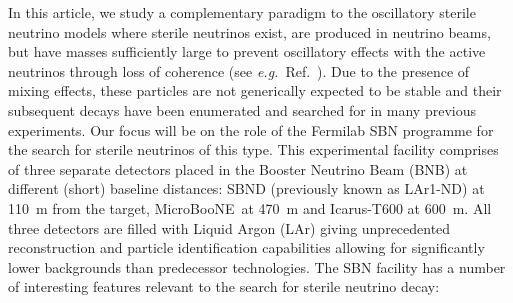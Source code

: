 \documentclass[11pt, a4paper]{article}
\newcommand{\refref}[1]{Ref.~\cite{#1}}
\def\eg{\emph{e.g.}}
\def\muboone{MicroBooNE}
\def\icarus{Icarus}
\newcommand{\newtext}[2]{\textcolor{#1}{\ul{#2}}}
\begin{document}
In this article, we study a complementary paradigm to the oscillatory sterile
neutrino models where sterile neutrinos exist, are produced in neutrino beams,
but have masses sufficiently large to prevent oscillatory effects with the
active neutrinos through loss of coherence (see \eg\ \refref{Akhmedov:2009rb}).
Due to the presence of mixing effects, these particles are not generically
expected to be stable and their subsequent decays have been enumerated
\cite{Atre:2009rg} and searched for in many previous experiments.
%
Our focus will be on the role of the Fermilab SBN programme \cite{Antonello:2015lea}
for the search for sterile neutrinos of this type.
%
This experimental facility comprises of three separate detectors placed in the
Booster Neutrino Beam (BNB) at different (short) baseline distances: SBND
(previously known as LAr1-ND) at 110~m from the target, \muboone\ at 470~m and
\icarus-T600 at 600~m.  All three detectors are filled with Liquid Argon (LAr)
giving unprecedented reconstruction and particle identification capabilities
allowing for significantly lower backgrounds than predecessor technologies. 
%
%
The SBN facility has a number of interesting features relevant to the search
for sterile neutrino decay:
\end{document}
